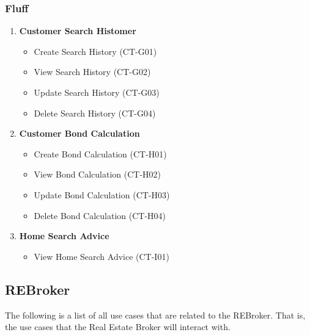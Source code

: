 \documentclass[11pt]{article}
\begin{document}
			\subsubsection{Fluff}
				\begin{enumerate}[i]
					\item \textbf{Customer Search Histomer}
					\begin{itemize}
						\item Create Search History (CT-G01)
						\item View Search History (CT-G02)
						\item Update Search History (CT-G03)
						\item Delete Search History (CT-G04)
					\end{itemize}
					
					\item \textbf{Customer Bond Calculation}
					\begin{itemize}
						\item Create Bond Calculation (CT-H01)
						\item View Bond Calculation (CT-H02)
						\item Update Bond Calculation (CT-H03)
						\item Delete Bond Calculation (CT-H04)
					\end{itemize}
					
					\item \textbf{Home Search Advice}
					\begin{itemize}
						\item View Home Search Advice (CT-I01)
					\end{itemize}
				\end{enumerate}
		

		\subsection{REBroker}
		\begin{flushleft}
			The following is a list of all use cases that are related to the REBroker. That is, the use cases that the Real Estate Broker will interact with.
		\end{flushleft}
			
\end{document}
